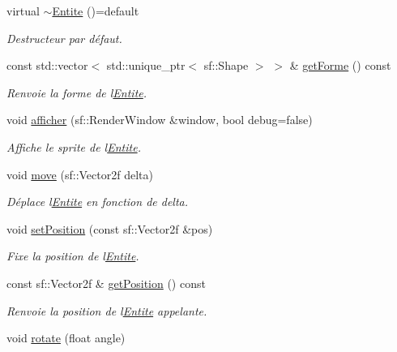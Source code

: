 \begin{DoxyCompactItemize}
\item 
virtual \hyperlink{class_entite_a8084762a25afbfbcdca31121a3dfcd87}{$\sim$\+Entite} ()=default
\begin{DoxyCompactList}\small\item\em Destructeur par défaut. \end{DoxyCompactList}\item 
const std\+::vector$<$ std\+::unique\+\_\+ptr$<$ sf\+::\+Shape $>$ $>$ \& \hyperlink{class_entite_ad7314f276ea1808e98cfd8b7d0e900c8}{get\+Forme} () const
\begin{DoxyCompactList}\small\item\em Renvoie la forme de l\textquotesingle{}\hyperlink{class_entite}{Entite}. \end{DoxyCompactList}\item 
void \hyperlink{class_entite_aff34325bb8f62fbe8b1cd1bec4dad99d}{afficher} (sf\+::\+Render\+Window \&window, bool debug=false)
\begin{DoxyCompactList}\small\item\em Affiche le sprite de l\textquotesingle{}\hyperlink{class_entite}{Entite}. \end{DoxyCompactList}\item 
void \hyperlink{class_entite_a0e682335d5ae1518970a30eb07d8e6d1}{move} (sf\+::\+Vector2f delta)
\begin{DoxyCompactList}\small\item\em Déplace l\textquotesingle{}\hyperlink{class_entite}{Entite} en fonction de {\itshape delta}. \end{DoxyCompactList}\item 
void \hyperlink{class_entite_aa7fe4a7ebd8eb4c80ef9fdb7d97f2dad}{set\+Position} (const sf\+::\+Vector2f \&pos)
\begin{DoxyCompactList}\small\item\em Fixe la position de l\textquotesingle{}\hyperlink{class_entite}{Entite}. \end{DoxyCompactList}\item 
const sf\+::\+Vector2f \& \hyperlink{class_entite_a6f6fd1e1f9f6ad44f0ecc74961a774d9}{get\+Position} () const
\begin{DoxyCompactList}\small\item\em Renvoie la position de l\textquotesingle{}\hyperlink{class_entite}{Entite} appelante. \end{DoxyCompactList}\item 
void \hyperlink{class_entite_af1249039d313e4e691a109440663eae7}{rotate} (float angle)

\end{DoxyCompactItemize}
